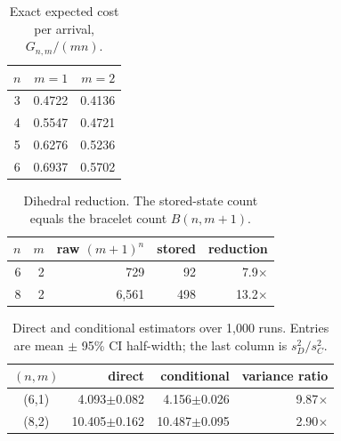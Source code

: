\begin{table}[t]
\centering
\caption{Exact expected cost per arrival, $G_{n,m}/(mn)$.}
\label{tab:costs}
\setlength{\tabcolsep}{5pt}
\begin{tabular}{c@{\quad}rr}
\toprule
$n$ & $m=1$ & $m=2$ \\
\midrule
3 & 0.4722 & 0.4136 \\
4 & 0.5547 & 0.4721 \\
5 & 0.6276 & 0.5236 \\
6 & 0.6937 & 0.5702 \\
\bottomrule
\end{tabular}
\end{table}

\begin{table}[t]
\centering
\caption{Dihedral reduction. The stored-state count equals the bracelet count $B(n,m+1)$.}
\label{tab:states}
\setlength{\tabcolsep}{4.5pt}
\begin{tabular}{rrrrr}
\toprule
$n$ & $m$ & raw $(m+1)^n$ & stored & reduction \\
\midrule
6 & 2 & 729 & 92 & 7.9$\times$ \\
8 & 2 & 6,561 & 498 & 13.2$\times$ \\
\bottomrule
\end{tabular}
\end{table}

\begin{table}[t]
\centering
\caption{Direct and conditional estimators over 1,000 runs. Entries are mean $\pm$ 95\% CI half-width; the last column is $s_D^2/s_C^2$.}
\label{tab:simulation}
\setlength{\tabcolsep}{4pt}
\begin{tabular}{crrr}
\toprule
$(n,m)$ & direct & conditional & variance ratio \\
\midrule
(6,1) & 4.093$\pm$0.082 & 4.156$\pm$0.026 & 9.87$\times$ \\
(8,2) & 10.405$\pm$0.162 & 10.487$\pm$0.095 & 2.90$\times$ \\
\bottomrule
\end{tabular}
\end{table}
